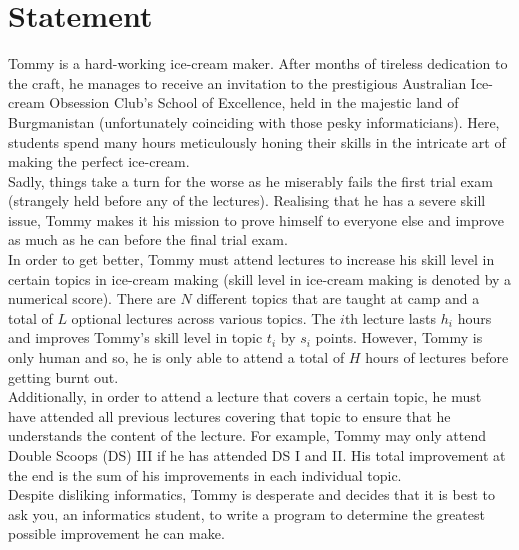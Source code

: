 \section*{Statement}
{
\noindent Tommy is a hard-working ice-cream maker. After months of tireless dedication to the craft, he manages to receive an invitation to the prestigious Australian Ice-cream Obsession Club's School of Excellence, held in the majestic land of Burgmanistan (unfortunately coinciding with those pesky informaticians). Here, students spend many hours meticulously honing their skills in the intricate art of making the perfect ice-cream.\\

\noindent Sadly, things take a turn for the worse as he miserably fails the first trial exam (strangely held before any of the lectures). Realising that he has a severe skill issue, Tommy makes it his mission to prove himself to everyone else and improve as much as he can before the final trial exam.\\

\noindent In order to get better, Tommy must attend lectures to increase his skill level in certain topics in ice-cream making (skill level in ice-cream making is denoted by a numerical score). There are $N$ different topics that are taught at camp and a total of $L$ optional lectures across various topics. The $i$th lecture lasts $h_i$ hours and improves Tommy's skill level in topic $t_i$ by $s_i$ points. However, Tommy is only human and so, he is only able to attend a total of $H$ hours of lectures before getting burnt out.\\

\noindent Additionally, in order to attend a lecture that covers a certain topic, he must have attended all previous lectures covering that topic to ensure that he understands the content of the lecture. For example, Tommy may only attend Double Scoops (DS) III if he has attended DS I and II. His total improvement at the end is the sum of his improvements in each individual topic.\\

\noindent Despite disliking informatics, Tommy is desperate and decides that it is best to ask you, an informatics student, to write a program to determine the greatest possible improvement he can make.
}